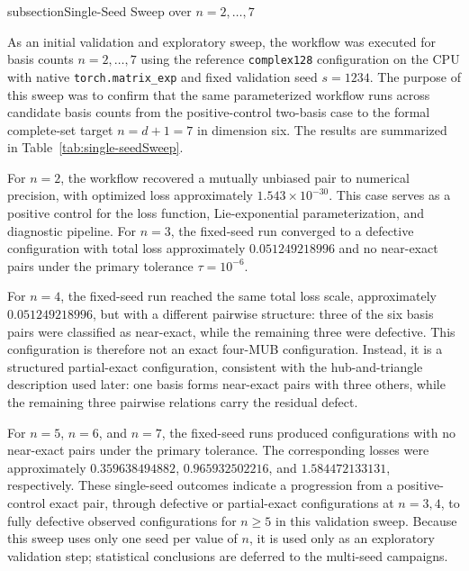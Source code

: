 \documentclass[a4paper,twocolumn,11pt,amsfonts,amssymb]{quantumarticle}
\begin{document}
subsection{\texorpdfstring{Single-Seed Sweep over \(n=2,\ldots,7\)}{Single-Seed Sweep over n=2,...,7}}
\label{subsec:single-seed-sweep}

As an initial validation and exploratory sweep, the workflow was executed for basis counts \(n=2,\ldots,7\) using the reference \texttt{complex128} configuration on the CPU with native \texttt{torch.matrix\_exp} and fixed validation seed \(s=1234\). The purpose of this sweep was to confirm that the same parameterized workflow runs across candidate basis counts from the positive-control two-basis case to the formal complete-set target \(n=d+1=7\) in dimension six. The results are summarized in Table~\ref{tab:single-seedSweep}.

For \(n=2\), the workflow recovered a mutually unbiased pair to numerical precision, with optimized loss approximately \(1.543\times 10^{-30}\). This case serves as a positive control for the loss function, Lie-exponential parameterization, and diagnostic pipeline. For \(n=3\), the fixed-seed run converged to a defective configuration with total loss approximately \(0.051249218996\) and no near-exact pairs under the primary tolerance \(\tau=10^{-6}\).

For \(n=4\), the fixed-seed run reached the same total loss scale, approximately \(0.051249218996\), but with a different pairwise structure: three of the six basis pairs were classified as near-exact, while the remaining three were defective. This configuration is therefore not an exact four-MUB configuration. Instead, it is a structured partial-exact configuration, consistent with the hub-and-triangle description used later: one basis forms near-exact pairs with three others, while the remaining three pairwise relations carry the residual defect.

For \(n=5\), \(n=6\), and \(n=7\), the fixed-seed runs produced configurations with no near-exact pairs under the primary tolerance. The corresponding losses were approximately \(0.359638494882\), \(0.965932502216\), and \(1.584472133131\), respectively. These single-seed outcomes indicate a progression from a positive-control exact pair, through defective or partial-exact configurations at \(n=3,4\), to fully defective observed configurations for \(n\geq 5\) in this validation sweep. Because this sweep uses only one seed per value of \(n\), it is used only as an exploratory validation step; statistical conclusions are deferred to the multi-seed campaigns.
\end{document}
